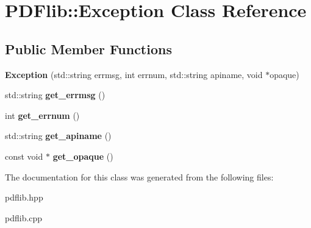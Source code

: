 \hypertarget{classPDFlib_1_1Exception}{}\section{P\+D\+Flib\+:\+:Exception Class Reference}
\label{classPDFlib_1_1Exception}
\subsection*{Public Member Functions}
\begin{DoxyCompactItemize}
\item 
\hypertarget{classPDFlib_1_1Exception_a57fa9533e1498e00612ac13349c78ac8}{}\label{classPDFlib_1_1Exception_a57fa9533e1498e00612ac13349c78ac8} 
{\bfseries Exception} (std\+::string errmsg, int errnum, std\+::string apiname, void $\ast$opaque)
\item 
\hypertarget{classPDFlib_1_1Exception_a0a197e182bf824c5654f721bf18debbf}{}\label{classPDFlib_1_1Exception_a0a197e182bf824c5654f721bf18debbf} 
std\+::string {\bfseries get\+\_\+errmsg} ()
\item 
\hypertarget{classPDFlib_1_1Exception_aa29ae977a69d26d5a6aea1da399ff599}{}\label{classPDFlib_1_1Exception_aa29ae977a69d26d5a6aea1da399ff599} 
int {\bfseries get\+\_\+errnum} ()
\item 
\hypertarget{classPDFlib_1_1Exception_a1463d47b0cb8d9f2251ffcbede9f6310}{}\label{classPDFlib_1_1Exception_a1463d47b0cb8d9f2251ffcbede9f6310} 
std\+::string {\bfseries get\+\_\+apiname} ()
\item 
\hypertarget{classPDFlib_1_1Exception_a6a286472fd0e02d9a02d24c2d83478f1}{}\label{classPDFlib_1_1Exception_a6a286472fd0e02d9a02d24c2d83478f1} 
const void $\ast$ {\bfseries get\+\_\+opaque} ()
\end{DoxyCompactItemize}


The documentation for this class was generated from the following files\+:\begin{DoxyCompactItemize}
\item 
pdflib.\+hpp\item 
pdflib.\+cpp\end{DoxyCompactItemize}
